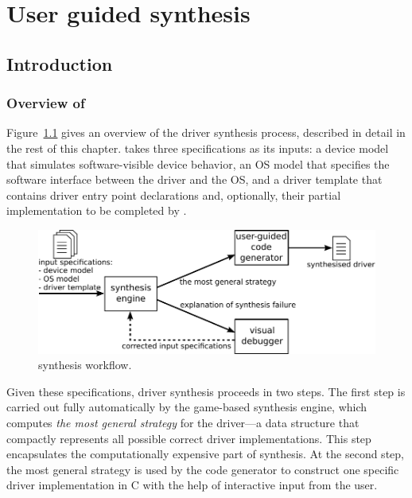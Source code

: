 \chapter{User guided synthesis}
\label{c:userguided}

\section{Introduction}\label{sec:user_guided_intro}

\subsection{Overview of \termite} Figure~\ref{f:termite} gives an overview of the driver synthesis process, described in detail in the rest of this chapter.  \termite takes three specifications as its inputs: a device model that simulates software-visible device behavior, an OS model that specifies the software interface between the driver and the OS, and a driver template that contains driver entry point declarations and, optionally, their partial implementation to be completed by \termite.

\begin{figure}
    \center
    \includegraphics[width=\linewidth]{imgs/termite.pdf}
    \caption{\termite synthesis workflow.}\label{f:termite}
\end{figure}

Given these specifications, driver synthesis proceeds in two steps.  The first step is carried out fully automatically by the \termite game-based synthesis engine, which computes \emph{the most general strategy} for the driver---a data structure that compactly represents all possible correct driver implementations.  This step encapsulates the computationally expensive part of synthesis.  At the second step, the most general strategy is used by the \termite code generator to construct one specific driver implementation in C with the help of interactive input from the user.

